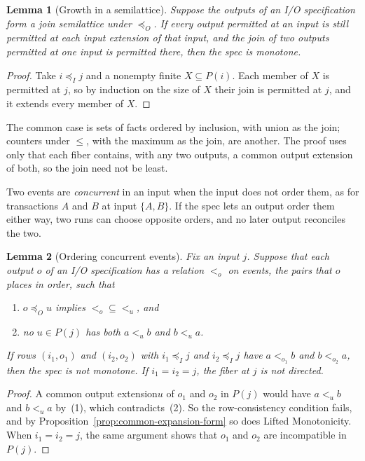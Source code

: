 \documentclass[sigconf]{cidr-2027}
\newtheorem{lemma}{Lemma}
\theoremstyle{remark}
\newcommand{\InputOrd}{\preceq_I}
\newcommand{\OutputOrd}{\preceq_O}
\newcommand{\indesc}{input extension\xspace} %
\newcommand{\outrel}{extends\xspace}          %
\newcommand{\outnoun}{output extension\xspace}%
\newcommand{\spectype}[1][]{I/O specification#1\xspace}
\newcommand{\fiber}[1]{P(#1)}
\begin{document}
\begin{lemma}[Growth in a semilattice]
\label{lem:accumulating}
Suppose the outputs of an \spectype form a join semilattice under
$\OutputOrd$. If every output permitted at an input is still permitted at each
\indesc of that input, and the join of two outputs permitted at one input is
permitted there, then the spec is monotone.
\end{lemma}

\begin{proof}
Take $i\InputOrd j$ and a nonempty finite $X\subseteq\fiber{i}$. Each member
of $X$ is permitted at $j$, so by induction on the size of $X$ their join is
permitted at $j$, and it \outrel every member of $X$.
\end{proof}

The common case is sets of facts ordered by inclusion, with union as the join;
counters under $\leq$, with the maximum as the join, are another. The proof
uses only that each fiber contains, with any two outputs, a common \outnoun of
both, so the join need not be least.

Two events are \emph{concurrent} in an input when the input does not order
them, as for transactions $A$ and $B$ at input $\{A,B\}$. If the spec lets an
output order them either way, two runs can choose opposite orders, and no
later output reconciles the two.

\begin{lemma}[Ordering concurrent events]
\label{lem:order-commitment}
Fix an input $j$. Suppose that each output $o$ of an \spectype has a relation
$<_o$ on events, the pairs that $o$ places in order, such that
\begin{enumerate}
\item
$o\OutputOrd u$ implies ${<_o}\subseteq{<_u}$, and
\item
no $u\in\fiber{j}$ has both $a<_u b$ and $b<_u a$.
\end{enumerate}
If rows $(i_1,o_1)$ and $(i_2,o_2)$ with $i_1\InputOrd j$ and $i_2\InputOrd j$
have $a<_{o_1}b$ and $b<_{o_2}a$, then the spec is not monotone. If
$i_1=i_2=j$, the fiber at $j$ is not directed.
\end{lemma}

\begin{proof}
A common \outnoun $u$ of $o_1$ and $o_2$ in $\fiber{j}$ would have $a<_u b$
and $b<_u a$ by~(1), which contradicts~(2). So the row-consistency condition
fails, and by Proposition~\ref{prop:common-expansion-form} so does Lifted
Monotonicity. When $i_1=i_2=j$, the same argument shows that $o_1$ and $o_2$
are incompatible in $\fiber{j}$.
\end{proof}
\end{document}
